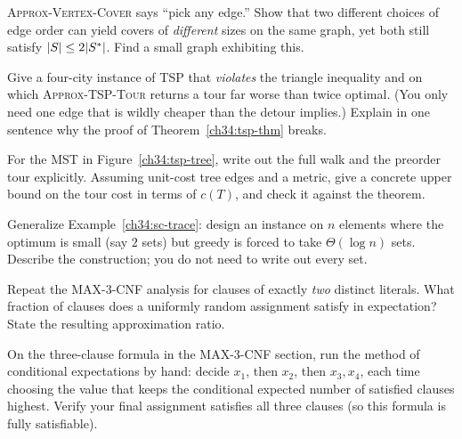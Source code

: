 \begin{exercise}
\label{ch34:ex-vc-order}
\textsc{Approx-Vertex-Cover} says ``pick any edge.'' Show that two different
choices of edge order can yield covers of \emph{different} sizes on the same
graph, yet both still satisfy $\lvert S\rvert\le 2\lvert S^{*}\rvert$. Find a small graph
exhibiting this.
\end{exercise}

\begin{exercise}
\label{ch34:ex-tsp-metric}
Give a four-city instance of TSP that \emph{violates} the triangle inequality
and on which \textsc{Approx-TSP-Tour} returns a tour far worse than twice
optimal. (You only need one edge that is wildly cheaper than the detour
implies.) Explain in one sentence why the proof of
Theorem~\ref{ch34:tsp-thm} breaks.
\end{exercise}

\begin{exercise}
\label{ch34:ex-tsp-preorder}
For the MST in Figure~\ref{ch34:tsp-tree}, write out the full walk and the
preorder tour explicitly. Assuming unit-cost tree edges and a metric, give a
concrete upper bound on the tour cost in terms of $c(T)$, and check it against
the theorem.
\end{exercise}

\begin{exercise}
\label{ch34:ex-sc-bad}
Generalize Example~\ref{ch34:sc-trace}: design an instance on $n$ elements
where the optimum is small (say $2$ sets) but greedy is forced to take
$\Theta(\log n)$ sets. Describe the construction; you do not need to write out
every set.
\end{exercise}

\begin{exercise}
\label{ch34:ex-max2}
Repeat the MAX-3-CNF analysis for clauses of exactly \emph{two} distinct
literals. What fraction of clauses does a uniformly random assignment satisfy
in expectation? State the resulting approximation ratio.
\end{exercise}

\begin{exercise}
\label{ch34:ex-cond-exp}
On the three-clause formula in the MAX-3-CNF section, run the method of
conditional expectations by hand: decide $x_1$, then $x_2$, then $x_3,x_4$,
each time choosing the value that keeps the conditional expected number of
satisfied clauses highest. Verify your final assignment satisfies all three
clauses (so this formula is fully satisfiable).
\end{exercise}

